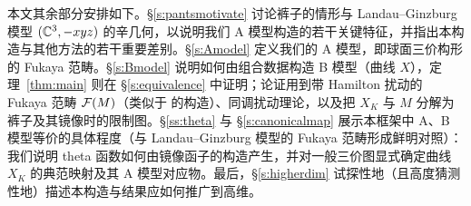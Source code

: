 本文其余部分安排如下。§\ref{s:pantsmotivate} 讨论裤子的情形与 Landau--Ginzburg 模型 $(\mathbb{C}^3,-xyz)$ 的辛几何，以说明我们 A 模型构造的若干关键特征，并指出本构造与其他方法的若干重要差别。§\ref{s:Amodel} 定义我们的 A 模型，即球面三价构形的 Fukaya 范畴。§\ref{s:Bmodel} 说明如何由组合数据构造 B 模型（曲线 $X$），定理~\ref{thm:main} 则在 §\ref{s:equivalence} 中证明；论证用到带 Hamilton 扰动的 Fukaya 范畴 $\mathcal{F}(M)$（类似于 \cite{Lee} 的构造）、同调扰动理论，以及把 $X_K$ 与 $M$ 分解为裤子及其镜像时的限制图。§\ref{ss:theta} 与 §\ref{s:canonicalmap} 展示本框架中 A、B 模型等价的具体程度（与 Landau--Ginzburg 模型的 Fukaya 范畴形成鲜明对照）：我们说明 theta 函数如何由镜像函子的构造产生，并对一般三价图显式确定曲线 $X_K$ 的典范映射及其 A 模型对应物。最后，§\ref{s:higherdim} 试探性地（且高度猜测性地）描述本构造与结果应如何推广到高维。
